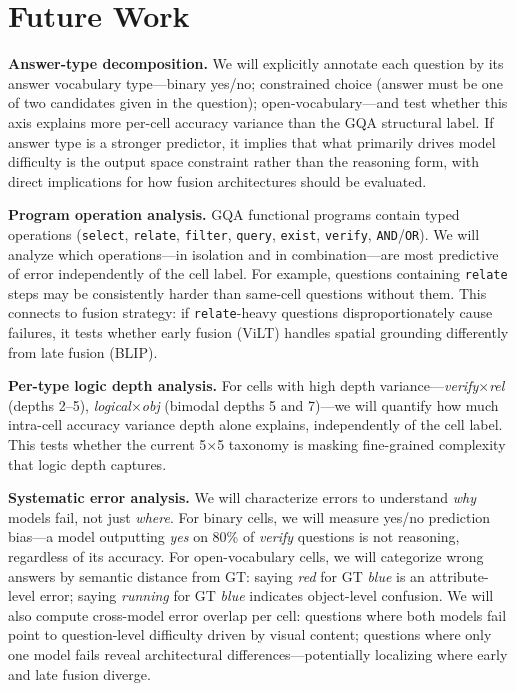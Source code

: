 \documentclass[11pt]{article}
\begin{document}
\section{Future Work}
\label{sec:future}

\textbf{Answer-type decomposition.}
We will explicitly annotate each question by its answer vocabulary type---binary yes/no; constrained choice (answer must be one of two candidates given in the question); open-vocabulary---and test whether this axis explains more per-cell accuracy variance than the GQA structural label. If answer type is a stronger predictor, it implies that what primarily drives model difficulty is the output space constraint rather than the reasoning form, with direct implications for how fusion architectures should be evaluated.

\textbf{Program operation analysis.}
GQA functional programs contain typed operations (\texttt{select}, \texttt{relate}, \texttt{filter}, \texttt{query}, \texttt{exist}, \texttt{verify}, \texttt{AND}/\texttt{OR}). We will analyze which operations---in isolation and in combination---are most predictive of error independently of the cell label. For example, questions containing \texttt{relate} steps may be consistently harder than same-cell questions without them. This connects to fusion strategy: if \texttt{relate}-heavy questions disproportionately cause failures, it tests whether early fusion (ViLT) handles spatial grounding differently from late fusion (BLIP).

\textbf{Per-type logic depth analysis.}
For cells with high depth variance---\textit{verify}$\times$\textit{rel} (depths 2--5), \textit{logical}$\times$\textit{obj} (bimodal depths 5 and 7)---we will quantify how much intra-cell accuracy variance depth alone explains, independently of the cell label. This tests whether the current 5$\times$5 taxonomy is masking fine-grained complexity that logic depth captures.

\textbf{Systematic error analysis.}
We will characterize errors to understand \emph{why} models fail, not just \emph{where}. For binary cells, we will measure yes/no prediction bias---a model outputting \emph{yes} on 80\% of \textit{verify} questions is not reasoning, regardless of its accuracy. For open-vocabulary cells, we will categorize wrong answers by semantic distance from GT: saying \emph{red} for GT \emph{blue} is an attribute-level error; saying \emph{running} for GT \emph{blue} indicates object-level confusion. We will also compute cross-model error overlap per cell: questions where both models fail point to question-level difficulty driven by visual content; questions where only one model fails reveal architectural differences---potentially localizing where early and late fusion diverge.
\end{document}
